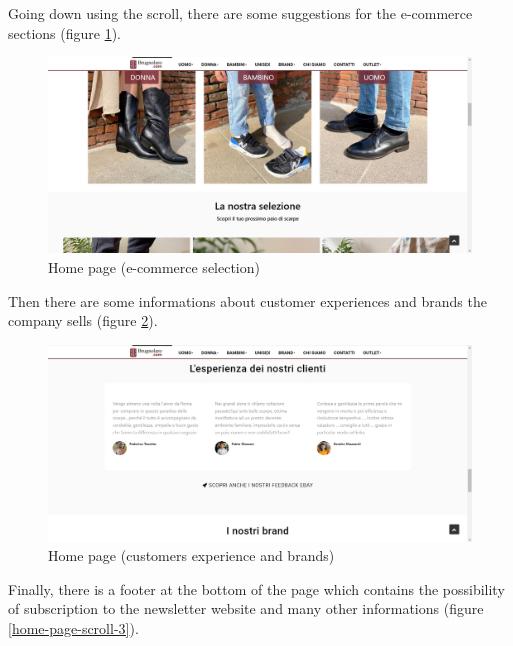\vspace*{\fill}
\vspace*{\fill}
Going down using the scroll, there are some suggestions for the
e-commerce sections (figure \ref{home-page-scroll-1}).
\vspace*{\fill}
\vspace*{\fill}
\begin{figure}[!h] 
    \centering 
    \includegraphics[scale = 0.29]{images/hp_scroll1.png} 
    \caption{Home page (e-commerce selection)}
    \label{home-page-scroll-1}
\end{figure}
\vspace*{\fill}
\newpage
Then there are some informations about customer experiences and
brands the company sells (figure \ref{home-page-scroll-2}).
\begin{figure}[!h] 
    \centering 
    \includegraphics[scale = 0.29]{images/hp_scroll2.png} 
    \caption{Home page (customers experience and brands)}
    \label{home-page-scroll-2}
\end{figure}
\newline
Finally, there is a footer at the bottom of the page which contains
the possibility of subscription to the newsletter website and many other
informations (figure \ref{home-page-scroll-3}).
